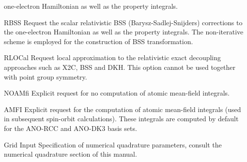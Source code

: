 \begin{keywordlist}
one-electron Hamiltonian as well as the property integrals.
\item[RBSS]
Request the scalar relativistic BSS (Barysz-Sadlej-Snijders) corrections to the
one-electron Hamiltonian as well as the property integrals. The non-iterative
scheme is employed for the construction of BSS transformation.
\item[RLOCal]
Request local approximation to the relativistic exact decoupling approaches such
as X2C, BSS and DKH. This option cannot be used together with point group symmetry.
\item[NOAMfi]
Explicit request for no computation of atomic mean-field integrals.
\item[AMFI]
Explicit request for the computation of atomic mean-field integrals (used in
subsequent spin-orbit calculations). These integrals are computed by default for the
ANO-RCC and ANO-DK3 basis sets.
\item[Grid Input]
Specification of numerical quadrature parameters, consult the numerical quadrature section of this
manual.
\end{keywordlist}


